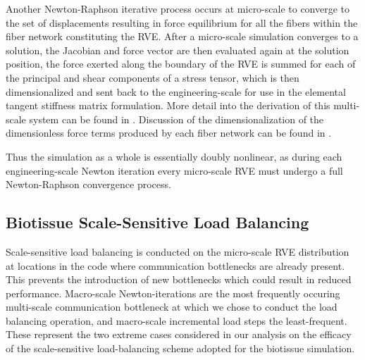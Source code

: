\documentclass[11pt]{siamltex1213}
\begin{document}
Another Newton-Raphson iterative process occurs at micro-scale to converge to the set of displacements resulting in force equilibrium for all the fibers within the fiber network constituting the RVE. After a micro-scale simulation converges to a solution, the Jacobian and force vector are then evaluated again at the solution position, the force exerted along the boundary of the RVE is summed for each of the principal and shear components of a stress tensor, which is then dimensionalized and sent back to the engineering-scale for use in the elemental tangent stiffness matrix formulation. More detail into the derivation of this multi-scale system can be found in \cite{stylianopoulos2008thesis} \cite{agoram2001coupled} \cite{stylianopoulos2007multiscale} . Discussion of the dimensionalization of the dimensionless force terms produced by each fiber network can be found in \cite{stylianopoulos2007volume} \cite{chandran2007deterministic}.


Thus the simulation as a whole is essentially doubly nonlinear, as during each engineering-scale Newton iteration every micro-scale RVE must undergo a full Newton-Raphson convergence process. 

\subsection{Biotissue Scale-Sensitive Load Balancing}\label{biotissue_load_balancing}

Scale-sensitive load balancing is conducted on the micro-scale RVE distribution at locations in the code where communication bottlenecks are already present. This prevents the introduction of new bottlenecks which could result in reduced performance. Macro-scale Newton-iterations are the most frequently occuring multi-scale communication bottleneck at which we chose to conduct the load balancing operation, and macro-scale incremental load steps the least-frequent. These represent the two extreme cases considered in our analysis on the efficacy of the scale-sensitive load-balancing scheme adopted for the biotissue simulation.
\end{document}
